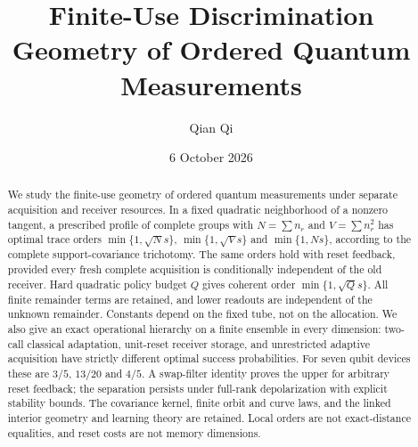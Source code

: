 \documentclass[11pt]{amsart}
\title[Finite-use discrimination geometry]{Finite-Use Discrimination Geometry of Ordered Quantum Measurements}
\author{Qian Qi}
\date{6 October 2026}
\numberwithin{equation}{section}
\theoremstyle{definition}\newtheorem{definition}[theorem]{Definition}
\theoremstyle{remark}\newtheorem{remark}[theorem]{Remark}
\begin{document}
\raggedbottom
\begin{abstract}
We study the finite-use geometry of ordered quantum measurements under
separate acquisition and receiver resources.  In a fixed quadratic
neighborhood of a nonzero tangent, a prescribed profile of complete
groups with $N=\sum n_r$ and $V=\sum n_r^2$ has optimal trace orders
$\min\{1,\sqrt Ns\}$, $\min\{1,\sqrt Vs\}$ and $\min\{1,Ns\}$,
according to the complete support-covariance trichotomy.  The same orders
hold with reset feedback, provided every fresh complete acquisition is
conditionally independent of the old receiver.  Hard quadratic policy
budget $Q$ gives coherent order $\min\{1,\sqrt Qs\}$.  All finite remainder
terms are retained, and lower readouts are independent of the unknown
remainder.  Constants depend on the fixed tube, not on the allocation.
We also give an exact operational hierarchy on a finite ensemble in every
dimension: two-call classical adaptation, unit-reset receiver storage,
and unrestricted adaptive acquisition have strictly different optimal
success probabilities.  For seven qubit devices these are $3/5$, $13/20$
and $4/5$.  A swap-filter identity proves the upper for arbitrary reset
feedback; the separation persists under full-rank depolarization with
explicit stability bounds.  The covariance kernel, finite orbit and curve
laws, and the linked interior geometry and learning theory are retained.
Local orders are not exact-distance equalities, and reset costs are not
memory dimensions.
\end{abstract}
\maketitle

















\end{document}
